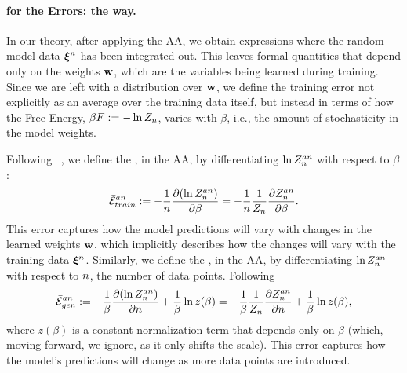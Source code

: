 \paragraph{\GeneratingFunctions for the Errors: the \STATMECH way.}
In our theory, after applying the AA, we obtain expressions where the random model data $\boldsymbol{\xi}^{n}$ has been integrated out. This leaves formal quantities that depend only on the weights ${\mathbf{w}}$, which are the variables being learned during training.
Since we are left with a distribution over ${\mathbf{w}}$, we define the training error not explicitly as an average over the training data itself, but instead in terms of how the Free Energy, $\beta F :=-\ln Z_{n}$, varies with $\beta$, i.e., the amount of stochasticity in the model weights.

Following ~\cite{LTS90, Solla2023},
we define the \emph{\AverageTrainingError}, in the AA,
by differentiating $\ln Z^{an}_{n}$ with respect to $\beta$:
\begin{align}
  \label{eqn:avgte_def}
  \bar{\mathcal{E}}_{train}^{an}
  := -\frac{1}{n}\dfrac{\partial (\ln Z^{an}_{n})}{\partial \beta} 
  = -\frac{1}{n}\frac{1}{Z_{n}}\dfrac{\partial Z^{an}_{n}}{\partial \beta} .
\end{align}
This error captures how the model predictions will vary with changes in the learned
weights ${\mathbf{w}}$, which implicitly describes how the changes will vary with the
training data $\boldsymbol{\xi}^{n}$.
%
Similarly, 
we define the \emph{\AverageGeneralizationError}, in the AA,
by differentiating $\ln Z^{an}_{n}$ with respect to $n$, the number of data points.
Following 
\begin{align}
  \label{eqn:avgge_def}
  \bar{\mathcal{E}}_{gen}^{an}
  := -\frac{1}{\beta}\dfrac{\partial (\ln Z^{an}_{n})}{\partial n}    +\frac{1}{\beta}\ln z(\beta)  
  =  -\frac{1}{\beta}\frac{1}{Z_{n}}\dfrac{\partial Z^{an}_{n}}{\partial n}
  +\frac{1}{\beta}\ln z(\beta) ,
\end{align}
where $z(\beta)$ is a constant normalization term that depends only on $\beta$ (which, moving forward, we ignore, as it only shifts the scale).
This error captures how the model’s predictions will change as more data points are introduced.

